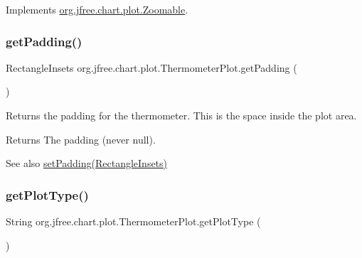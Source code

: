 Implements \mbox{\hyperlink{interfaceorg_1_1jfree_1_1chart_1_1plot_1_1_zoomable_a293ef8fc796608bde4d44dfbac8dfdda}{org.\+jfree.\+chart.\+plot.\+Zoomable}}.

\mbox{\label{classorg_1_1jfree_1_1chart_1_1plot_1_1_thermometer_plot_ae13b7526bb60e9b130430b510bd39d49}} 
\subsubsection{\texorpdfstring{get\+Padding()}{getPadding()}}
{\footnotesize\ttfamily Rectangle\+Insets org.\+jfree.\+chart.\+plot.\+Thermometer\+Plot.\+get\+Padding (\begin{DoxyParamCaption}{ }\end{DoxyParamCaption})}

Returns the padding for the thermometer. This is the space inside the plot area.

\begin{DoxyReturn}{Returns}
The padding (never {\ttfamily null}).
\end{DoxyReturn}
\begin{DoxySeeAlso}{See also}
\mbox{\hyperlink{classorg_1_1jfree_1_1chart_1_1plot_1_1_thermometer_plot_aca84c9a7372af7b31ae1845629f22c15}{set\+Padding(\+Rectangle\+Insets)}} 
\end{DoxySeeAlso}
\mbox{\label{classorg_1_1jfree_1_1chart_1_1plot_1_1_thermometer_plot_af5f898b94a9f7e6c2df5e502260f90c7}} 
\subsubsection{\texorpdfstring{get\+Plot\+Type()}{getPlotType()}}
{\footnotesize\ttfamily String org.\+jfree.\+chart.\+plot.\+Thermometer\+Plot.\+get\+Plot\+Type (\begin{DoxyParamCaption}{ }\end{DoxyParamCaption})}

